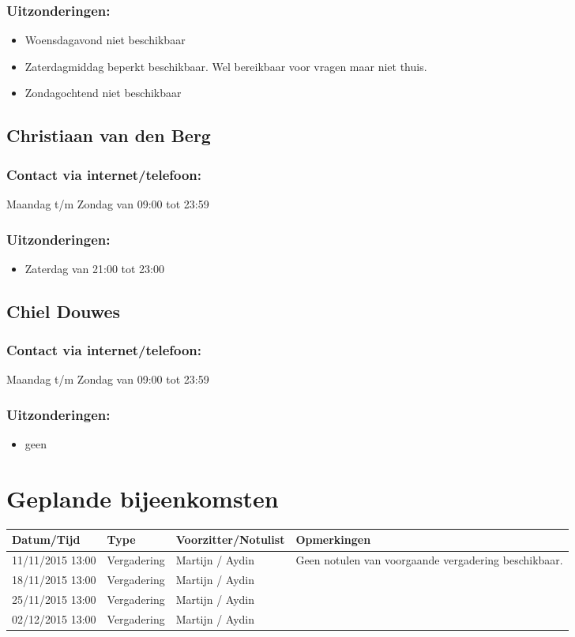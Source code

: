 \documentclass[dutch]{hu}
\begin{document}
\subsection*{Uitzonderingen:}
\begin{itemize}
\item Woensdagavond niet beschikbaar
\item Zaterdagmiddag beperkt beschikbaar. Wel bereikbaar voor vragen maar niet thuis. 
\item Zondagochtend niet beschikbaar
\end{itemize}

\section*{Christiaan van den Berg}
\subsection*{Contact via internet/telefoon:}
Maandag t/m Zondag van 09:00 tot 23:59
\subsection*{Uitzonderingen:}
\begin{itemize}
\item Zaterdag van 21:00 tot 23:00
\end{itemize}

\section*{Chiel Douwes}
\subsection*{Contact via internet/telefoon:}
Maandag t/m Zondag van 09:00 tot 23:59
\subsection*{Uitzonderingen:}
\begin{itemize}
\item geen
\end{itemize}


\chapter{Geplande bijeenkomsten}
\begin{tabular}{ p{3cm} l l p{5cm}}
\textbf{Datum/Tijd} & \textbf{Type} & \textbf{Voorzitter/Notulist} & \textbf{Opmerkingen} \\
\hline
11/11/2015 13:00 & Vergadering & Martijn / Aydin & Geen notulen van voorgaande vergadering beschikbaar. \\
\hline
18/11/2015 13:00 & Vergadering & Martijn / Aydin \\
\hline
25/11/2015 13:00 & Vergadering & Martijn / Aydin \\
\hline
02/12/2015 13:00 & Vergadering & Martijn / Aydin 
\end{tabular}
\end{document}
